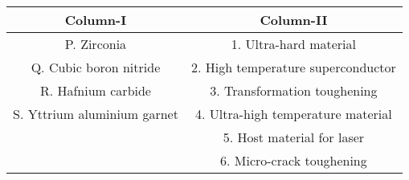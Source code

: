 \begin{tabular}{|c|c|} 
        \hline
        \textbf{Column-I} & \textbf{Column-II} \\
        \hline
        P. Zirconia & 1. Ultra-hard material \\
        \hline
        Q. Cubic boron nitride & 2. High temperature superconductor \\
        \hline
        R. Hafnium carbide & 3. Transformation toughening\\
        \hline
        S. Yttrium aluminium garnet & 4. Ultra-high temperature material \\
        \hline
         & 5. Host material for laser \\
        \hline
          & 6. Micro-crack toughening \\
        \hline
    \end{tabular}